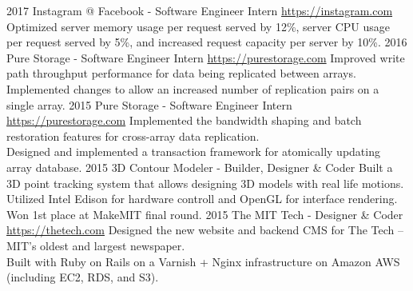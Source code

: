 \documentclass[print]{friggeri-cv} %
\begin{document}
\begin{entrylist}
  \entry
  {2017}
  {Instagram @ Facebook - Software Engineer Intern}
  {\href{https://instagram.com}{https://instagram.com}}
  {Optimized server memory usage per request served by 12\%, server CPU usage per request served by 5\%, and increased request capacity per server by 10\%. }
  \entry
  {2016}
  {Pure Storage - Software Engineer Intern}
  {\href{https://purestorage.com}{https://purestorage.com}}
  {Improved write path throughput performance for data being replicated between arrays. \\
  Implemented changes to allow an increased number of replication pairs on a single array. }
  \entry
  {2015}
  {Pure Storage - Software Engineer Intern}
  {\href{https://purestorage.com}{https://purestorage.com}}
  {Implemented the bandwidth shaping and batch restoration features for cross-array data replication. \\
  Designed and implemented a transaction framework for atomically updating array database. }
  \entry
  {2015}
  {3D Contour Modeler - Builder, Designer \& Coder}
  {}
  {Built a 3D point tracking system that allows designing 3D models with real life motions. \\
  Utilized Intel Edison for hardware controll and OpenGL for interface rendering. \\
  Won 1st place at MakeMIT final round. }
  \entry
  {2015}
  {The MIT Tech - Designer \& Coder}
  {\href{https://thetech.com}{https://thetech.com}}
  {Designed the new website and backend CMS for The Tech -- MIT's oldest and largest newspaper. \\
  Built with Ruby on Rails on a Varnish + Nginx infrastructure on Amazon AWS (including EC2, RDS, and S3). }

\end{entrylist}
\end{document}
